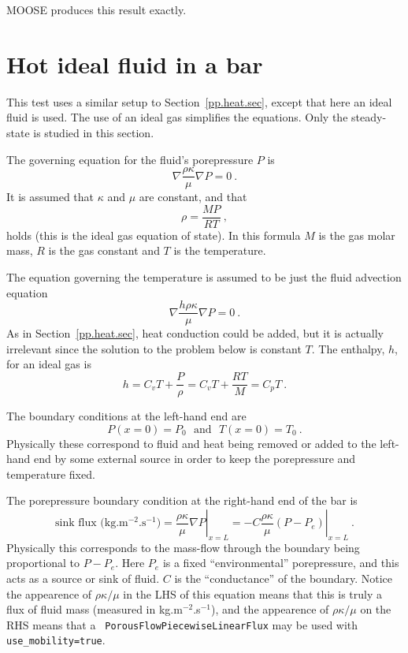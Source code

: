 \documentclass[]{scrreprt}
\begin{document}
MOOSE produces this result exactly.


\chapter{Hot ideal fluid in a bar}

This test uses a similar setup to Section~\ref{pp.heat.sec}, except
that here an ideal fluid is used.  The use of an ideal gas simplifies
the equations.  Only the steady-state is studied in this section.

The governing equation for the fluid's porepressure $P$ is
\begin{equation}
\nabla \frac{\rho\kappa}{\mu}\nabla P = 0 \ .
\end{equation}
It is assumed that $\kappa$ and $\mu$ are constant, and that
\begin{equation}
\rho = \frac{MP}{RT} \ ,
\end{equation}
holds (this is the ideal gas equation of state).  In this formula $M$
is the gas molar mass, $R$ is the gas constant and $T$ is the
temperature.

The equation governing the temperature is assumed to be just the fluid
advection equation
\begin{equation}
\nabla\frac{h\rho\kappa}{\mu}\nabla P = 0 \ .
\end{equation}
As in Section~\ref{pp.heat.sec}, heat conduction could be added, but
it is actually irrelevant since the solution to the problem below is
constant $T$.  The enthalpy, $h$, for an ideal gas is
\begin{equation}
h = C_{v}T + \frac{P}{\rho} = C_{v}T + \frac{RT}{M} = C_{p}T \ .
\end{equation}

The boundary conditions at the left-hand end are
\begin{equation}
P(x=0) = P_{0} \ \ \ \mbox{and}\ \ \ T(x=0)=T_{0} \ .
\end{equation}
Physically these correspond to fluid and heat being removed or added
to the left-hand end by some external source in order to keep the
porepressure and temperature fixed.

The porepressure boundary condition
at the right-hand end of the bar is
\begin{equation}
\mbox{sink flux (kg.m$^{-2}$.s$^{-1}$)} =
\left. \frac{\rho\kappa}{\mu}\nabla P \right|_{x=L} =
\left. -C\frac{\rho\kappa}{\mu} (P - P_{e}) \right|_{x=L} \ .
\label{ideal.mass.bdy}
\end{equation}
Physically this corresponds to the mass-flow through the boundary
being proportional to $P-P_{e}$.  Here $P_{e}$ is a fixed
``environmental'' porepressure, and this acts as a source or sink of
fluid.  $C$ is the ``conductance'' of the boundary.  Notice the
appearence of $\rho \kappa/\mu$ in the LHS of this equation means that
this is truly a flux of fluid mass (measured in kg.m$^{-2}$.s$^{-1}$),
and the appearence of $\rho\kappa/\mu$ on the RHS means that a {\tt
  PorousFlowPiecewiseLinearFlux} may be used with {\tt
  use\_mobility=true}.
\end{document}
